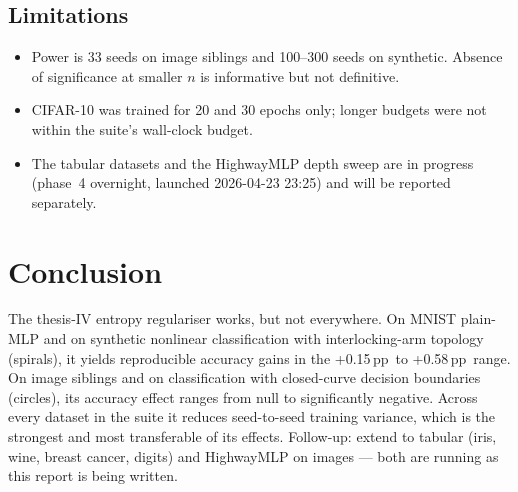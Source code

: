 \documentclass[11pt,a4paper]{article}
\newcommand{\pp}{\,pp\xspace}
\begin{document}
\subsection{Limitations}

\begin{itemize}
  \item Power is 33 seeds on image siblings and 100--300 seeds on
    synthetic. Absence of significance at smaller $n$ is informative
    but not definitive.
  \item CIFAR-10 was trained for 20 and 30 epochs only; longer budgets
    were not within the suite's wall-clock budget.
  \item The tabular datasets and the HighwayMLP depth sweep are in
    progress (phase~4 overnight, launched 2026-04-23 23:25) and will
    be reported separately.
\end{itemize}

\section{Conclusion}

The thesis-IV entropy regulariser works, but not everywhere. On MNIST
plain-MLP and on synthetic nonlinear classification with interlocking-arm
topology (spirals), it yields reproducible accuracy gains in the
+0.15\pp\ to +0.58\pp\ range. On image siblings and on classification
with closed-curve decision boundaries (circles), its accuracy effect
ranges from null to significantly negative. Across every dataset in
the suite it reduces seed-to-seed training variance, which is the
strongest and most transferable of its effects. Follow-up: extend to
tabular (iris, wine, breast cancer, digits) and HighwayMLP on images
--- both are running as this report is being written.
\end{document}
